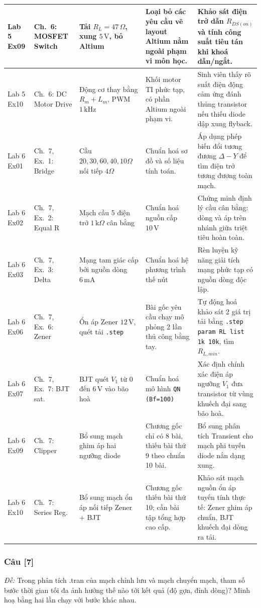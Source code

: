 \documentclass[12pt,a4paper]{article}
\newcommand{\cauhoi}[2]{%
  \subsubsection{Câu [#1]}
  \begin{tcolorbox}[colback=white,colframe=guidegray!70,boxrule=0.4pt,arc=1pt,left=5pt,right=5pt,top=2pt,bottom=2pt]
  \small\textit{Đề:} #2
  \end{tcolorbox}
  \par\vspace{4pt}}
\begin{document}
{\begin{longtable}{|p{1.5cm}|p{2.5cm}|p{3.1cm}|p{3.7cm}|p{3.8cm}|}
Lab 5 Ex09 & Ch.~6: MOSFET Switch & Tải $R_L=47\,\Omega$, xung $5\,\text{V}$, bỏ Altium & Loại bỏ các yêu cầu vẽ layout Altium nằm ngoài phạm vi môn học. & Khảo sát điện trở dẫn $R_{DS(on)}$ và tính công suất tiêu tán khi khoá dẫn/ngắt. \\ \hline
Lab 5 Ex10 & Ch.~6: DC Motor Drive & Động cơ thay bằng $R_m + L_m$, PWM $1\,\text{kHz}$ & Khối motor TI phức tạp, có phần Altium ngoài phạm vi. & Sinh viên thấy rõ suất điện động cảm ứng đánh thủng transistor nếu thiếu diode dập xung flyback. \\ \hline
Lab 6 Ex01 & Ch.~7, Ex.~1: Bridge & Cầu $20, 30, 60, 40, 10\Omega$ nối tiếp $4\Omega$ & Chuẩn hoá sơ đồ và số liệu tính toán. & Áp dụng phép biến đổi tương đương $\Delta - Y$ để tìm điện trở tương đương toàn mạch. \\ \hline
Lab 6 Ex02 & Ch.~7, Ex.~2: Equal R & Mạch cầu 5 điện trở $1\,\text{k}\Omega$ cân bằng & Chuẩn hoá nguồn cấp $10\,\text{V}$ & Chứng minh định lý cầu cân bằng: dòng và áp trên nhánh giữa triệt tiêu hoàn toàn. \\ \hline
Lab 6 Ex03 & Ch.~7, Ex.~3: Delta & Mạng tam giác cấp bởi nguồn dòng $6\,\text{mA}$ & Chuẩn hoá hệ phương trình thế nút & Rèn luyện kỹ năng giải tích mạng phức tạp có nguồn dòng độc lập. \\ \hline
Lab 6 Ex06 & Ch.~7, Ex.~6: Zener & Ổn áp Zener $12\,\text{V}$, quét tải \texttt{.step} & Bài gốc yêu cầu chạy mô phỏng 2 lần thủ công bằng tay. & Tự động hoá khảo sát 2 giá trị tải bằng \texttt{.step param RL list 1k 10k}, tìm $R_{L,min}$. \\ \hline
Lab 6 Ex07 & Ch.~7, Ex.~7: BJT sat. & BJT quét $V_1$ từ 0 đến $6\,\text{V}$ vào bão hoà & Chuẩn hoá mô hình \texttt{QN (Bf=100)} & Xác định chính xác điện áp ngưỡng $V_1$ đưa transistor từ vùng khuếch đại sang bão hoà. \\ \hline
Lab 6 Ex09 & Ch.~7: Clipper & Bổ sung mạch ghim áp hai ngưỡng diode & Chương gốc chỉ có 8 bài, thiếu bài thứ 9 theo chuẩn 10 bài. & Bổ sung phân tích Transient cho mạch phi tuyến diode nắn dạng xung. \\ \hline
Lab 6 Ex10 & Ch.~7: Series Reg. & Bổ sung mạch ổn áp nối tiếp Zener + BJT & Chương gốc thiếu bài thứ 10; cần bài tập tổng hợp cao cấp. & Khảo sát mạch nguồn ổn áp tuyến tính thực tế: Zener ghim áp chuẩn, BJT khuếch đại dòng ra tải. \\ \hline
\end{longtable}}

\cauhoi{7}{Trong phân tích .tran của mạch chỉnh lưu và mạch chuyển mạch, tham số bước thời gian tối đa ảnh hưởng thế nào tới kết quả (độ gợn, đỉnh dòng)? Minh hoạ bằng hai lần chạy với bước khác nhau.}
\end{document}
